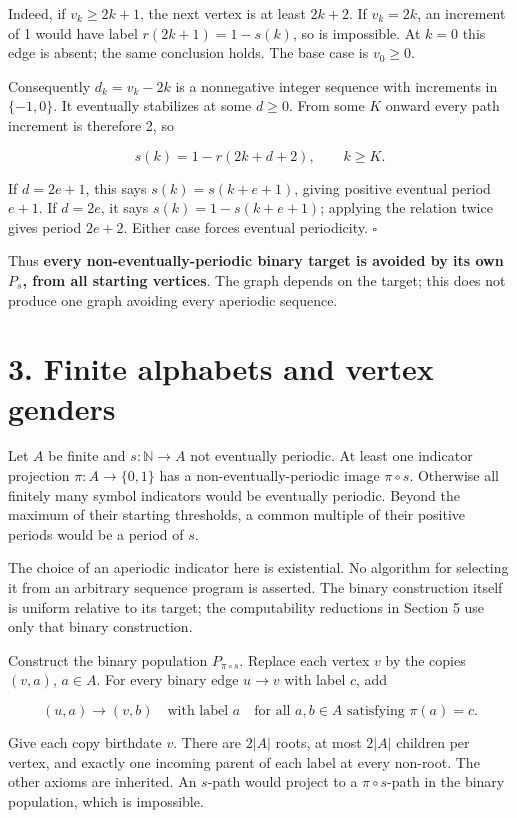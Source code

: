 \documentclass[
  11pt,
]{article}
\begin{document}
Indeed, if \(v_k\ge2k+1\), the next vertex is at least \(2k+2\). If
\(v_k=2k\), an increment of 1 would have label \(r(2k+1)=1-s(k)\), so is
impossible. At \(k=0\) this edge is absent; the same conclusion holds.
The base case is \(v_0\ge0\).

Consequently \(d_k=v_k-2k\) is a nonnegative integer sequence with
increments in \(\{-1,0\}\). It eventually stabilizes at some \(d\ge0\).
From some \(K\) onward every path increment is therefore 2, so

\[s(k)=1-r(2k+d+2),\qquad k\ge K.\]

If \(d=2e+1\), this says \(s(k)=s(k+e+1)\), giving positive eventual
period \(e+1\). If \(d=2e\), it says \(s(k)=1-s(k+e+1)\); applying the
relation twice gives period \(2e+2\). Either case forces eventual
periodicity.
\leavevmode\unskip{}\hbox{}\nobreak\hfill\quad\hbox{$\square$}

Thus \textbf{every non-eventually-periodic binary target is avoided by
its own \(P_s\), from all starting vertices}. The graph depends on the
target; this does not produce one graph avoiding every aperiodic
sequence.

\section{3. Finite alphabets and vertex
genders}\label{finite-alphabets-and-vertex-genders}

Let \(A\) be finite and \(s:\mathbb N\to A\) not eventually periodic. At
least one indicator projection \(\pi:A\to\{0,1\}\) has a
non-eventually-periodic image \(\pi\circ s\). Otherwise all finitely
many symbol indicators would be eventually periodic. Beyond the maximum
of their starting thresholds, a common multiple of their positive
periods would be a period of \(s\).

The choice of an aperiodic indicator here is existential. No algorithm
for selecting it from an arbitrary sequence program is asserted. The
binary construction itself is uniform relative to its target; the
computability reductions in Section 5 use only that binary construction.

Construct the binary population \(P_{\pi\circ s}\). Replace each vertex
\(v\) by the copies \((v,a)\), \(a\in A\). For every binary edge
\(u\to v\) with label \(c\), add

\[ (u,a)\longrightarrow(v,b)\quad\text{with label }a
   \quad\text{for all }a,b\in A\text{ satisfying }\pi(a)=c.\]

Give each copy birthdate \(v\). There are \(2|A|\) roots, at most
\(2|A|\) children per vertex, and exactly one incoming parent of each
label at every non-root. The other axioms are inherited. An \(s\)-path
would project to a \(\pi\circ s\)-path in the binary population, which
is impossible.
\end{document}

